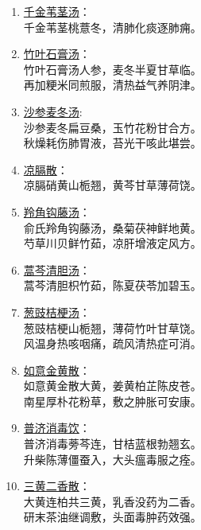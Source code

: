 \documentclass[cn,black,12pt,founder,normal,twocolumn]{elegantnote}
\begin{document}
\begin{enumerate}
    \item \uline{千金苇茎汤}：\\
    千金苇茎桃薏冬，清肺化痰逐肺痈。
    \item \uline{竹叶石膏汤}：\\
    竹叶石膏汤人参，麦冬半夏甘草临。\\
    再加粳米同煎服，清热益气养阴津。
    \item \uline{沙参麦冬汤}: \\
    沙参麦冬扁豆桑，玉竹花粉甘合方。\\
    秋燥耗伤肺胃液，苔光干咳此堪尝。
    \item \uline{凉膈散}：\\
    凉膈硝黄山栀翘，黄芩甘草薄荷饶。
    \item \uline{羚角钩藤汤}：\\
    俞氏羚角钩藤汤，桑菊茯神鲜地黄。\\
    芍草川贝鲜竹茹，凉肝增液定风方。
    \item \uline{蒿芩清胆汤}：\\
    蒿芩清胆枳竹茹，陈夏茯苓加碧玉。
    \item \uline{葱豉桔梗汤}：\\
    葱豉桔梗山栀翘，薄荷竹叶甘草饶。\\
    风温身热咳咽痛，疏风清热症可消。
    \item \uline{如意金黄散}：\\
    如意黄金散大黄，姜黄柏芷陈皮苍。\\
    南星厚朴花粉草，敷之肿胀可安康。
    \item \uline{普济消毒饮}：\\
    普济消毒蒡芩连，甘桔蓝根勃翘玄。\\
    升柴陈薄僵蚕入，大头瘟毒服之痊。
    \item \uline{三黄二香散}：\\
    大黄连柏共三黄，乳香没药为二香。\\
    研末茶油继调敷，头面毒肿药效强。
\end{enumerate}





















\end{document}
